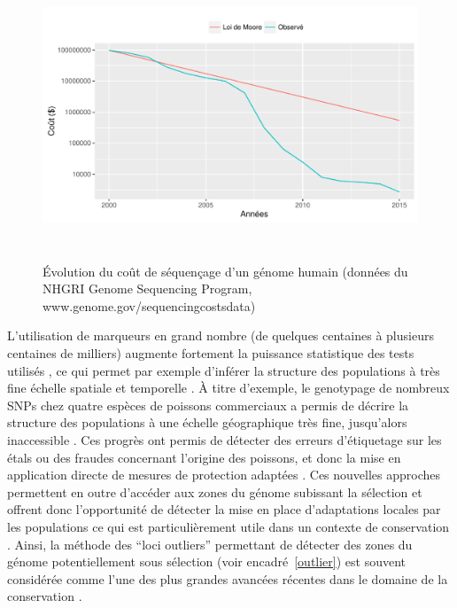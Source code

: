 \documentclass[a4paper,12pt,twoside]{article}\usepackage[]{graphicx}\usepackage[]{color}
\newenvironment{knitrout}{}{} %
\begin{document}
\begin{knitrout}
\color{fgcolor}\begin{figure}[htpb]

{\centering \includegraphics[width=15cm,height=8.6cm]{figure/moore-1} 

}

\caption[Évolution du coût de séquençage d'un génome humain]{Évolution du coût de séquençage d'un génome humain (données du NHGRI Genome Sequencing Program, www.genome.gov/sequencingcostsdata)}\label{fig:moore}
\end{figure}


\end{knitrout}

L'utilisation de marqueurs en grand nombre (de quelques centaines à plusieurs centaines de milliers) augmente fortement la puissance statistique des tests utilisés \citep{waples1998separating, gagnaire2015aa}, ce qui permet par exemple d'inférer la structure des populations à très fine échelle spatiale et temporelle \citep{szulkin2016population, mccormack2013next}. À titre d'exemple, le genotypage de nombreux SNPs chez quatre espèces de poissons commerciaux a permis de décrire la structure des populations à une échelle géographique très fine, jusqu'alors inaccessible \citep{martinsohn2009fishpoptrace, shafer2015genomics}. Ces progrès ont permis de détecter des erreurs d'étiquetage sur les étals ou des fraudes concernant l'origine des poissons, et donc la mise en application directe de mesures de protection adaptées \citep{martinsohn2009fishpoptrace}.
Ces nouvelles approches permettent en outre d'accéder aux zones du génome subissant la sélection et offrent donc l'opportunité de détecter la mise en place d'adaptations locales par les populations \citep{stapley2010adaptation} ce qui est par\-ti\-cu\-lière\-ment utile dans un contexte de conservation \citep{steiner2013conservation}. Ainsi, la méthode des ``loci outliers'' permettant de détecter des zones du génome potentiellement sous sélection (voir encadré~\ref{outlier}) est souvent considérée comme l'une des plus grandes avancées récentes dans le domaine de la conservation \citep{funk2012harnessing, mcmahon2014and, shafer2015genomics}.
\end{document}
